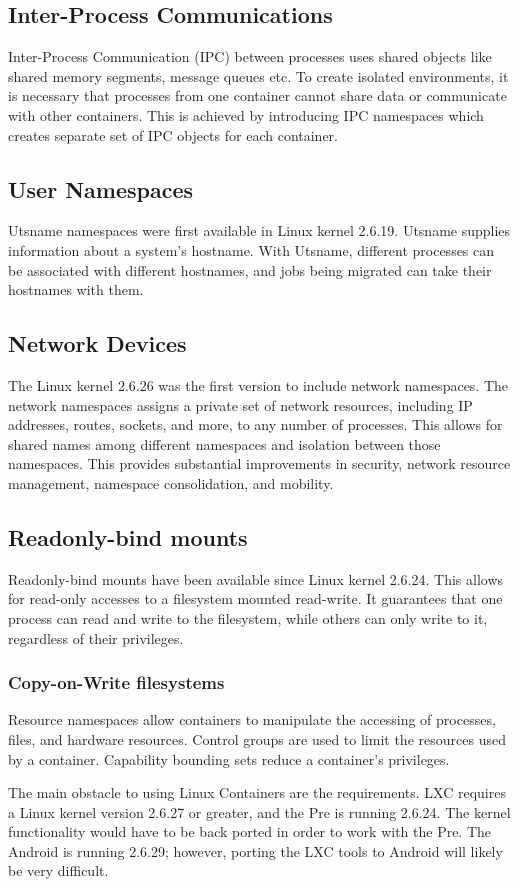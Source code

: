 \subsection{Inter-Process Communications}
Inter-Process Communication (IPC) between processes uses shared objects like shared memory segments, message queues etc. To create isolated environments, it is necessary that processes from one container cannot share data or communicate with other containers. This is achieved by introducing IPC namespaces which creates separate set of IPC objects for each container.

\subsection{User Namespaces}
Utsname namespaces were first available in Linux kernel 2.6.19.  Utsname supplies information about a system's hostname.  With Utsname, different processes can be associated with different hostnames, and jobs being migrated can take their hostnames with them.

\subsection{Network Devices}
The Linux kernel 2.6.26 was the first version to include network namespaces.  The network namespaces assigns a private set of network resources, including IP addresses, routes, sockets, and more, to any number of processes.  This allows for shared names among different namespaces and isolation between those namespaces.  This provides substantial improvements in security, network resource management, namespace consolidation, and mobility.

\subsection{Readonly-bind mounts}
Readonly-bind mounts have been available since Linux kernel 2.6.24.  This allows for read-only accesses to a filesystem mounted read-write.  It guarantees that one process can read and write to the filesystem, while others can only write to it, regardless of their privileges.

\subsubsection{Copy-on-Write filesystems}

Resource namespaces allow containers to manipulate the accessing of processes, files, and hardware resources.  Control groups are used to limit the resources used by a container.  Capability bounding sets reduce a container's privileges.  

The main obstacle to using Linux Containers are the requirements.  LXC requires a Linux kernel version 2.6.27 or greater, and the Pre is running 2.6.24.  The kernel functionality would have to be back ported in order to work with the Pre.  The Android is running 2.6.29; however, porting the LXC tools to Android will likely be very difficult.

